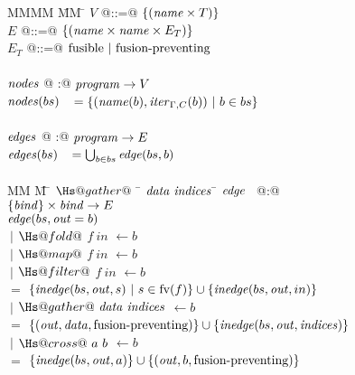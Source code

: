 \begin{figure}
\begin{tabbing}
MMMM       \= MM  \= \kill
$V$ \> @::=@ \> $\{(\mathit{name} \times T)\}$ \\
$E$ \> @::=@ \> $\{(\mathit{name} \times \mathit{name} \times E_T)\}$ \\
$E_T$ \> @::=@ \> $\mathrm{fusible} ~|~ \mbox{fusion-preventing}$ \\
\\
$\mathit{nodes}$     \> @  :@ \> $\mathit{program} \to V$                          \\
$\mathit{nodes}(bs)$ \> $~~= \{(\mathit{name}(b), \mathit{iter}_{\Gamma,C}(b)) ~|~ b \in bs\}$
\\
\\
$\mathit{edges}$     \> @  :@ \> $\mathit{program} \to E$                          \\
$\mathit{edges}(bs)$ \> $~~= \bigcup_{b \in bs} \mathit{edge}(bs, b)$
\\
\\
MM             \= M \= $\Hs@gather@~$ \= $\mathit{data}~\mathit{indices}$ \= \kill
$\mathit{edge}$      \> ~@:@ \> $\{\mathit{bind}\} \times \mathit{bind} \to E$ \\
$\mathit{edge}(bs, \mathit{out} = b)$ \\
   \> $~|$ \> $\Hs@fold@$ \> $f~in$ \> $\gets b$ \\
   \> $~|$ \> $\Hs@map@$ \> $f~in$ \> $\gets b$ \\
   \> $~|$ \> $\Hs@filter@$ \> $f~in$ \> $\gets b$ \\
    \> $=$    \> $\{\mathit{inedge}(bs,\mathit{out},s) ~|~ s \in \textrm{fv}(f)\} \cup \{\mathit{inedge}(bs, \mathit{out}, in) \}$
\\[1ex]
   \> $~|$ \> $\Hs@gather@~\data~\indices$ \> \> $\gets b$ \\
    \> $=$    \> $\{(\mathit{out},\mathit{data}, \mbox{fusion-preventing}) \} \cup \{\mathit{inedge}(bs, \mathit{out}, \mathit{indices}) \}$      
\\[1ex]
   \> $~|$ \> $\Hs@cross@~a~b$ \> \> $\gets b$ \\
    \> $=$    \> $\{\mathit{inedge}(bs, \mathit{out}, a) \}           \cup      \{(\mathit{out}, b, \mbox{fusion-preventing}) \}$

\end{tabbing}
\end{figure}
